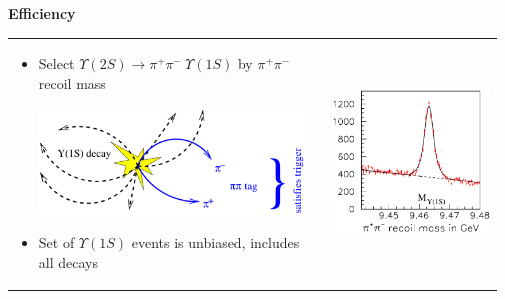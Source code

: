 \documentclass[landscape]{article}
\newenvironment{slide}[1][ ]{\mbox{\bf #1 } \vfill}{\vfill \mbox{ } \hfill \Large \arabic{page} \pagebreak}
\begin{document}
\begin{slide}[Efficiency]

\begin{tabular}{p{0.62\linewidth} c p{0.35\linewidth}}
  \begin{minipage}{\linewidth}
    \begin{itemize}\setlength{\itemsep}{0.75 cm}

      \item Select \mbox{$\Upsilon(2S) \to \pi^+ \pi^- \ \Upsilon(1S)$} by $\pi^+ \pi^-$ recoil mass

	\begin{center}
	  \includegraphics[width=0.9\linewidth]{twotoone}
	\end{center}

      \item Set of $\Upsilon(1S)$ events is unbiased, includes all decays

    \end{itemize}
  \end{minipage} & & \begin{minipage}{\linewidth}
    \includegraphics[width=\linewidth]{pipimass}
  \end{minipage}
\end{tabular}


\end{slide}
\end{document}
